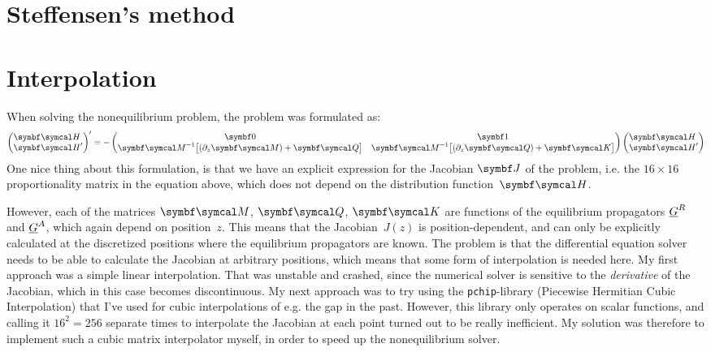 \section{Steffensen's method}

\clearpage
\section{Interpolation}
When solving the nonequilibrium problem, the problem was formulated as:
\begin{align}
  \begin{pmatrix}
    \BC{H}\phantom{'} \\
    \BC{H}' 
  \end{pmatrix}'
  =
  -
  \begin{pmatrix}
    \B{0} & 
    \B{1} \\
    \BC{M}^{-1} \big[ (\partial_z\BC{M}) + \BC{Q} \big] &
    \BC{M}^{-1} \big[ (\partial_z\BC{Q}) + \BC{K} \big]
  \end{pmatrix}
  \begin{pmatrix}
    \BC{H}\phantom{'} \\
    \BC{H}' 
  \end{pmatrix}
\end{align}
One nice thing about this formulation, is that we have an explicit expression for the Jacobian $\B{J}$ of the problem, i.e. the $16\times16$ proportionality matrix in the equation above, which does not depend on the distribution function~$\BC{H}$.

However, each of the matrices $\BC{M}$, $\BC{Q}$, $\BC{K}$ are functions of the equilibrium propagators $\underline{G}^R$ and $\underline{G}^A$, which again depend on position~$z$.
This means that the Jacobian~$J(z)$ is position-dependent, and can only be explicitly calculated at the discretized positions where the equilibrium propagators are known.
The problem is that the differential equation solver needs to be able to calculate the Jacobian at arbitrary positions, which means that some form of interpolation is needed here.
My first approach was a simple linear interpolation.
That was unstable and crashed, since the numerical solver is sensitive to the \emph{derivative} of the Jacobian, which in this case becomes discontinuous.
My next approach was to try using the \texttt{pchip}-library (Piecewise Hermitian Cubic Interpolation) that I've used for cubic interpolations of e.g. the gap in the past.
However, this library only operates on scalar functions, and calling it $16^2 = 256$ separate times to interpolate the Jacobian at each point turned out to be really inefficient.
My solution was therefore to implement such a cubic matrix interpolator myself, in order to speed up the nonequilibrium solver.

